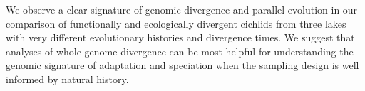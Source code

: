 We observe a clear signature of genomic divergence and parallel evolution in our comparison of functionally and ecologically divergent cichlids from three lakes with very different evolutionary histories and divergence times. We suggest that analyses of whole-genome divergence can be most helpful for understanding the genomic signature of adaptation and speciation when the sampling design is well informed by natural history.